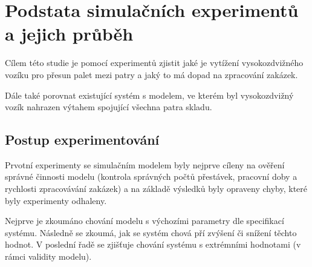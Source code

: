 \documentclass[11pt]{article}
\begin{document}
	\section{Podstata simulačních experimentů a jejich průběh}
	Cílem této studie je pomocí experimentů zjistit jaké je vytížení vysokozdvižného vozíku pro přesun palet mezi patry a jaký to má dopad na zpracování zakázek.
	
	Dále také porovnat existující systém s modelem, ve kterém byl vysokozdvižný vozík nahrazen výtahem spojující všechna patra skladu.
	
	\subsection{Postup experimentování}
	Prvotní experimenty se simulačním modelem byly nejprve cíleny na ověření správné činnosti modelu (kontrola správných počtů přestávek, pracovní doby a rychlosti zpracovávání zakázek) a na základě výsledků byly opraveny chyby, které byly experimenty odhaleny.
	
	Nejprve je zkoumáno chování modelu s výchozími parametry dle specifikací systému. Následně se zkoumá, jak se systém chová pří zvýšení či snížení těchto hodnot. V poslední řadě se zjišťuje chování systému s extrémními hodnotami (v rámci validity modelu).
	
\end{document}
